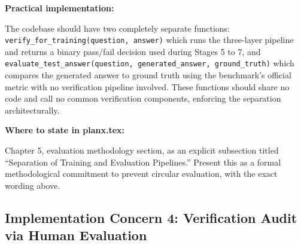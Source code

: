 \documentclass[11pt,a4paper]{article}
\begin{document}
{\textbf{Practical implementation:}

The codebase should have two completely separate functions: \texttt{verify\_for\_training(question, answer)} which runs the three-layer pipeline and returns a binary pass/fail decision used during Stages 5 to 7, and \texttt{evaluate\_test\_answer(question, generated\_answer, ground\_truth)} which compares the generated answer to ground truth using the benchmark's official metric with no verification pipeline involved. These functions should share no code and call no common verification components, enforcing the separation architecturally.

\textbf{Where to state in planx.tex:}

Chapter 5, evaluation methodology section, as an explicit subsection titled ``Separation of Training and Evaluation Pipelines.'' Present this as a formal methodological commitment to prevent circular evaluation, with the exact wording above.
}

\subsection{Implementation Concern 4: Verification Audit via Human Evaluation}
\end{document}
